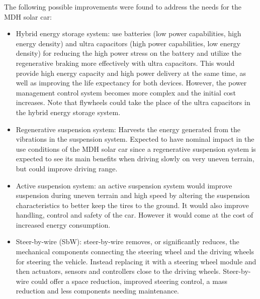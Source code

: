 The following possible improvements were found to address the needs for the MDH solar car:
\begin{itemize}
	\item Hybrid energy storage system: use batteries (low power capabilities, high energy density) and ultra capacitors (high power capabilities, low energy density) for reducing the high power stress on the battery and utilize the regenerative braking more effectively with ultra capacitors\:\cite{khajepourElectricHybridVehicles2014}\cite{un-noorComprehensiveStudyKey2017}\cite{kumarDevelopmentSchemeKey2017}\cite{tranThoroughStateoftheartAnalysis2020}. This would provide high energy capacity and high power delivery at the same time, as well as improving the life expectancy for both devices\:\cite{khajepourElectricHybridVehicles2014}\cite{un-noorComprehensiveStudyKey2017}\cite{tranThoroughStateoftheartAnalysis2020}. However, the power management control system becomes more complex and the initial cost increases\:\cite{khajepourElectricHybridVehicles2014}. Note that flywheels could take the place of the ultra capacitors in the hybrid energy storage system\:\cite{khajepourElectricHybridVehicles2014}.
	\item Regenerative suspension system: Harvests the energy generated from the vibrations in the suspension system\:\cite{khajepourElectricHybridVehicles2014}. Expected to have nominal impact in the use conditions of the MDH solar car since a regenerative suspension system is expected to see its main benefits when driving slowly on very uneven terrain\:\cite{khajepourElectricHybridVehicles2014}, but could improve driving range.
    \item Active suspension system: an active suspension system would improve suspension during uneven terrain and high speed by altering the suspension characteristics to better keep the tires to the ground\:\cite{khajepourElectricHybridVehicles2014}. It would also improve handling, control and safety of the car\:\cite{khajepourElectricHybridVehicles2014}. However it would come at the cost of increased energy consumption\:\cite{khajepourElectricHybridVehicles2014}.	
    \item Steer-by-wire (SbW): steer-by-wire removes, or significantly reduces, the mechanical components connecting the steering wheel and the driving wheels for steering the vehicle\:\cite{khajepourElectricHybridVehicles2014}. Instead replacing it with a steering wheel module and then actuators, sensors and controllers close to the driving wheels\:\cite{khajepourElectricHybridVehicles2014}. Steer-by-wire could offer a space reduction, improved steering control\:\cite{khajepourElectricHybridVehicles2014}, a mass reduction and less components needing maintenance.

\end{itemize}
